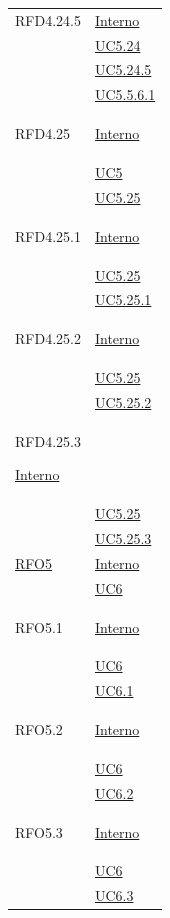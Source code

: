 \begin{longtable}{|>{\centering}m{5cm}|m{5cm}<{\centering}|}
\hypertarget{RFD4.24.5}{RFD4.24.5} & \hyperlink{Interno}{Interno}\\
&\hyperref[UC5.24]{UC5.24}\\
&\hyperref[UC5.24.5]{UC5.24.5}\\ 
&\hyperref[UC5.5.6.1]{UC5.5.6.1}\\ \hline

\hypertarget{RFD4.25}{RFD4.25} & \hyperlink{Interno}{Interno}\\
&\hyperref[UC5]{UC5}\\
&\hyperref[UC5.25]{UC5.25}\\ \hline

\hypertarget{RFD4.25.1}{RFD4.25.1} &  \hyperlink{Interno}{Interno}\\
&\hyperref[UC5.25]{UC5.25}\\
&\hyperref[UC5.25.1]{UC5.25.1}\\ \hline

\hypertarget{RFD4.25.2}{RFD4.25.2} & \hyperlink{Interno}{Interno}\\
&\hyperref[UC5.25]{UC5.25}\\
&\hyperref[UC5.25.2]{UC5.25.2}\\ \hline

\hypertarget{RFD4.25.3}{RFD4.25.3}   \hyperlink{Interno}{Interno}\\
&\hyperref[UC5.25]{UC5.25}\\
&\hyperref[UC5.25.3]{UC5.25.3}\\ \hline

\hyperlink{RFO5}{RFO5} & \hyperlink{Interno}{Interno}\\
& \hyperref[UC6]{UC6}\\ \hline

\hypertarget{RFO5.1}{RFO5.1}&  \hyperlink{Interno}{Interno}\\
& \hyperref[UC6]{UC6}\\ 
& \hyperref[UC6.1]{UC6.1}\\ \hline

\hypertarget{RFO5.2}{RFO5.2} &  \hyperlink{Interno}{Interno}\\
& \hyperref[UC6]{UC6}\\ 
& \hyperref[UC6.2]{UC6.2}\\ \hline

\hypertarget{RFO5.3}{RFO5.3} &  \hyperlink{Interno}{Interno}\\
& \hyperref[UC6]{UC6}\\ 
& \hyperref[UC6.3]{UC6.3}\\ \hline


\end{longtable}
